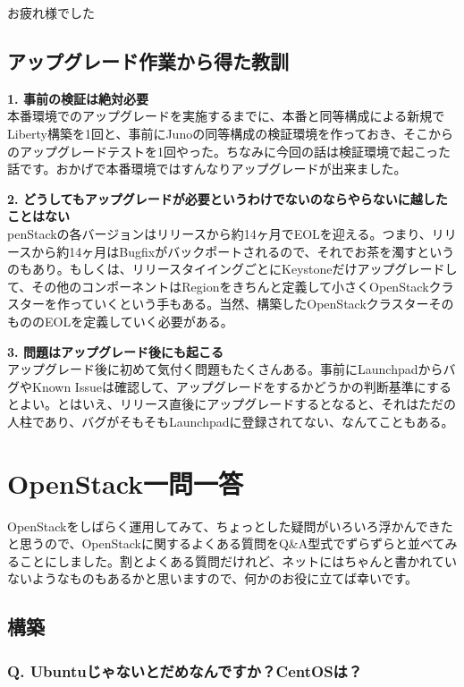 \documentclass[9pt,b5paper,tombo,openany]{jsbook}
\begin{document}
\noindent
お疲れ様でした

\section{アップグレード作業から得た教訓}
\noindent
\textbf{1. 事前の検証は絶対必要}\\[1ex]

本番環境でのアップグレードを実施するまでに、本番と同等構成による新規でLiberty構築を1回と、事前にJunoの同等構成の検証環境を作っておき、そこからのアップグレードテストを1回やった。ちなみに今回の話は検証環境で起こった話です。おかげで本番環境ではすんなりアップグレードが出来ました。

\noindent
\textbf{2. どうしてもアップグレードが必要というわけでないのならやらないに越したことはない}\\[1ex]

penStackの各バージョンはリリースから約14ヶ月でEOLを迎える。つまり、リリースから約14ヶ月はBugfixがバックポートされるので、それでお茶を濁すというのもあり。もしくは、リリースタイイングごとにKeystoneだけアップグレードして、その他のコンポーネントはRegionをきちんと定義して小さくOpenStackクラスターを作っていくという手もある。当然、構築したOpenStackクラスターそのもののEOLを定義していく必要がある。

\noindent
\textbf{3. 問題はアップグレード後にも起こる}\\[1ex]

アップグレード後に初めて気付く問題もたくさんある。事前にLaunchpadからバグやKnown Issueは確認して、アップグレードをするかどうかの判断基準にするとよい。とはいえ、リリース直後にアップグレードするとなると、それはただの人柱であり、バグがそもそもLaunchpadに登録されてない、なんてこともある。

\chapter{OpenStack一問一答}

OpenStackをしばらく運用してみて、ちょっとした疑問がいろいろ浮かんできたと思うので、OpenStackに関するよくある質問をQ\&A型式でずらずらと並べてみることにしました。割とよくある質問だけれど、ネットにはちゃんと書かれていないようなものもあるかと思いますので、何かのお役に立てば幸いです。

\section{構築}

\subsection*{{\LARGE\bfseries Q.} Ubuntuじゃないとだめなんですか？CentOSは？}
\end{document}
